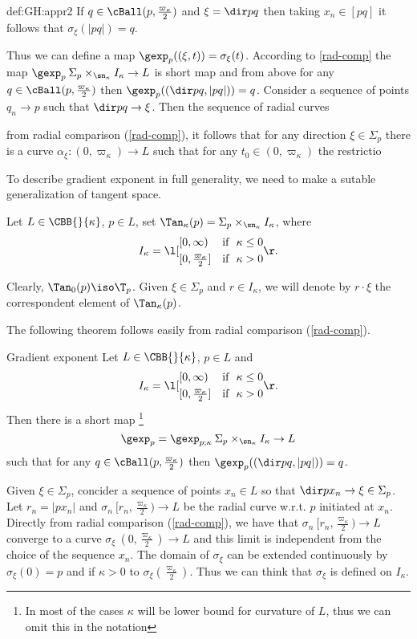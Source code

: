 {\begin{subthm}{def:GH:appr2}
If $q\in\cBall(p,\tfrac{\varpi_\kappa}2)$ and $\xi=\dir p q$ then taking $x_n\in[p q]$ it follows that $\sigma_\xi(|p q|)=q$.

Thus we can define a map 
$\gexp_p((\xi,t))=\sigma_\xi(t)$.
According to \ref{rad-comp} the map $\gexp_p\:\Sigma_p\times_{\sn_\kappa} I_\kappa\to L$ is short map 
and from above for any $q\in\cBall(p,\tfrac{\varpi_\kappa}2)$ then $\gexp_p((\dir p q,|p q|))=q$.
Consider a sequence of points $q_n\to p$ such that $\dir p q\to\xi$.
Then the sequence of radial curves 

from radial comparison (\ref{rad-comp}), 
it follows that for any direction $\xi\in \Sigma_p$ there is a curve $\alpha_\xi:(0,\varpi_\kappa)\to L$ such that for any $t_0\in (0,\varpi_\kappa)$ the restrictio

To describe gradient exponent in full generality, 
we need to make a sutable generalization of tangent space.

Let $L\in\CBB{}{\kappa}$,
$p\in L$, set
$\Tan_\kappa(p)=\Sigma_p\times_{\sn_\kappa} I_\kappa$, where 
$$I_\kappa=
\l[
\begin{aligned}
&[0,\infty)&\text{if}\ \ &\kappa\le0\\
&[0,\tfrac{\varpi_\kappa}2]&\text{if}\ \ &\kappa>0\\
\end{aligned}
\r.$$

Clearly, $\Tan_0(p)\iso\T_p$.
Given $\xi\in\Sigma_p$ and $r\in I_\kappa$, we will denote by $r\cdot\xi$ the correspondent element of $\Tan_\kappa(p)$.


The following theorem follows easily from radial comparison (\ref{rad-comp}).


\begin{thm}{Gradient exponent}\label{gexp}
Let $L\in\CBB{}{\kappa}$,
$p\in L$ 
and 
$$I_\kappa=
\l[
\begin{aligned}
&[0,\infty)&\text{if}\ \ &\kappa\le0\\
&[0,\tfrac{\varpi_\kappa}2]&\text{if}\ \ &\kappa>0\\
\end{aligned}
\r.$$
Then there is a short map%
\footnote{In most of the cases $\kappa$ will be lower bound for curvature of $L$, thus we can omit this in the notation} 
$$\gexp_{p}=\gexp_{p;\kappa}\:\Sigma_p\times_{\sn_\kappa} I_\kappa\to L$$
such that for any $q\in\cBall(p,\tfrac{\varpi_\kappa}2)$ then $\gexp_p((\dir p q,|p q|))=q$.
\end{thm}

Given $\xi\in \Sigma_p$,
concider a sequence of points $x_n\in L$ so that $\dir p{x_n}\to \xi\in\Sigma_p$.
Let $r_n=|p x_n|$ and $\sigma_n\:[r_n,\tfrac{\varpi_\kappa}2)\to L$ be the radial curve w.r.t. $p$ initiated at $x_n$.
Directly from radial comparison (\ref{rad-comp}), 
we have that $\sigma_n\:[r_n,\tfrac{\varpi_\kappa}2)\to L$ 
converge to a curve $\sigma_\xi\:(0,\tfrac{\varpi_\kappa}2)\to L$ 
and this limit is independent from the choice of the sequence $x_n$.
The domain of $\sigma_\xi$ can be extended continuously by $\sigma_\xi(0)=p$ 
and  if $\kappa>0$ to $\sigma_\xi(\tfrac{\varpi_\kappa}2)$.
Thus we can think that $\sigma_\xi$ is defined on $I_\kappa$.


\end{subthm}}
